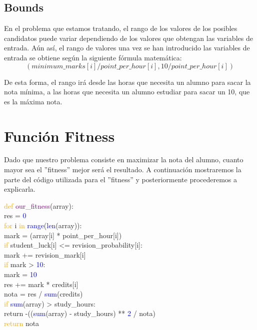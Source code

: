 \documentclass[11pt, a4paper, titlepage]{article}
\begin{document}
\subsection{Bounds}

En el problema que estamos tratando, el rango de los valores de los posibles candidatos puede variar dependiendo de los valores que obtengan las variables de entrada. Aún así, el rango de valores una vez se han introducido las variables de entrada se obtiene según la siguiente fórmula matemática:
\[
(minimum\_marks[i] / point\_per\_hour[i], 10 / point\_per\_hour[i])
\]

De esta forma, el rango irá desde las horas que necesita un alumno para sacar la nota mínima, a las horas que necesita un alumno estudiar para sacar un 10, que es la máxima nota.


\section{Función Fitness}
Dado que nuestro problema consiste en maximizar la nota del alumno, cuanto mayor sea el ''fitness'' mejor será el resultado. A continuación mostraremos la parte del código utilizada para el ''fitness'' y posteriormente procederemos a explicarla.

\vspace{5mm}

\textcolor{orange}{def} \textcolor{purple}{our\_fitness}(array):\\\hspace*{1em} res = \textcolor{blue}{0}\\
\hspace*{1em} \textcolor{orange}{for} i \textcolor{orange}{in} \textcolor{blue}{range}(\textcolor{blue}{len}(array)):\\
\hspace*{2em} mark = (array[i] * point\_per\_hour[i])\\
\hspace*{2em} \textcolor{orange}{if} student\_luck[i] <= revision\_probability[i]:\\
\hspace*{3em} mark += revision\_mark[i]\\
\hspace*{2em} \textcolor{orange}{if} mark > \textcolor{blue}{10}:\\
\hspace*{3em} mark = \textcolor{blue}{10}\\
\hspace*{2em} res += mark * credits[i]\\
\hspace*{1em} nota = res / \textcolor{blue}{sum}(credits)\\
\hspace*{1em} \textcolor{orange}{if} \textcolor{blue}{sum}(array) > study\_hours:\\
\hspace*{2em} return -((\textcolor{blue}{sum}(array) - study\_hours) ** \textcolor{blue}{2} / nota)\\
\hspace*{1em} \textcolor{orange}{return} nota\\
\end{document}
